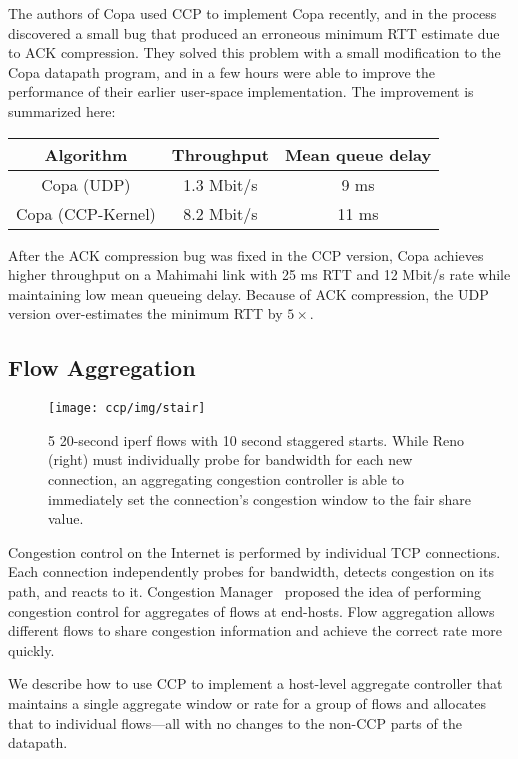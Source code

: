 The authors of Copa used CCP to implement Copa recently, and in the process discovered a small bug that produced an erroneous minimum RTT estimate due to ACK compression. They solved this problem with a small modification to the Copa datapath program,
and in a few hours were able to improve the performance of their earlier user-space implementation. The improvement is summarized here:

\begin{tabular}{c|c|c}
    Algorithm & Throughput & Mean queue delay \\
    \hline
    Copa (UDP) & 1.3 Mbit/s & 9 ms\\
    Copa (CCP-Kernel) & 8.2 Mbit/s  & 11 ms\\
\end{tabular}

\smallskip
After the ACK compression bug was fixed in the CCP version, Copa achieves higher throughput on a Mahimahi link with 25 ms RTT and 12 Mbit/s rate while maintaining low mean queueing delay. Because of ACK compression, the UDP version over-estimates the minimum RTT by $5\times$.


\subsection{Flow Aggregation}
\label{s:capabilities:agg}
\begin{figure}
    \centering
    \texttt{[image: ccp/img/stair]}
    \caption{5 20-second iperf flows with 10 second staggered starts. While Reno (right) must individually probe for bandwidth for each new connection, an aggregating congestion controller is able to immediately set the connection's congestion window to the fair share value.}
    \label{fig:cap:agg}
\end{figure}
%
Congestion control on the Internet is performed by individual TCP connections. Each connection independently probes for bandwidth, detects congestion on its path, and reacts to it. Congestion Manager~\cite{cm} proposed the idea of performing congestion control for aggregates of flows at end-hosts. Flow aggregation allows different flows to share congestion information and achieve the correct rate more quickly. 

We describe how to use CCP to implement a host-level aggregate controller that maintains a single aggregate window or rate for a group of flows and allocates that to individual flows---all with no changes to the non-CCP parts of the datapath.


